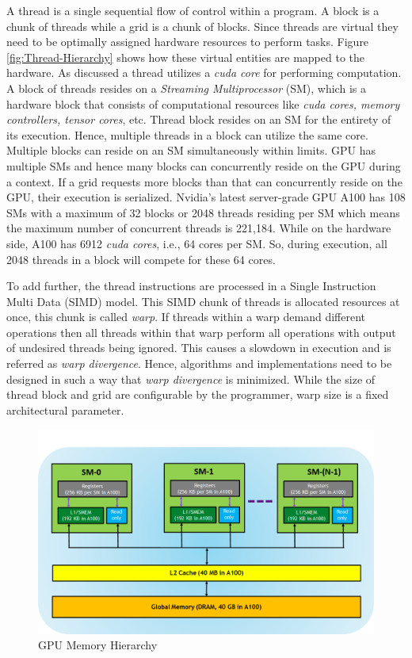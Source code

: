 A thread is a single sequential flow of control within a program.
A block is a chunk of threads while a grid is a chunk of blocks.
Since threads are virtual they need to be optimally assigned hardware resources to perform tasks.
Figure \ref{fig:Thread-Hierarchy} shows how these virtual entities are mapped to the hardware. As discussed a thread utilizes a \textit{cuda core} for performing computation. A block of threads resides on a \textit{Streaming Multiprocessor} (SM), which is a hardware block that consists of computational resources like \textit{cuda cores, memory controllers, tensor cores}, etc. Thread block resides on an SM for the entirety of its execution. Hence, multiple threads in a block can utilize the same core. Multiple blocks can reside on an SM simultaneously within limits.
GPU has multiple SMs and hence many blocks can concurrently reside on the GPU during a context. If a grid requests more blocks than that can concurrently reside on the GPU, their execution is serialized.
Nvidia's latest server-grade GPU A100 has 108 SMs with a maximum of 32 blocks or 2048 threads residing per SM which means the maximum number of concurrent threads is  221,184. While on the hardware side, A100 has 6912 \textit{cuda cores}, i.e., 64 cores per SM. So, during execution, all 2048 threads in a block will compete for these 64 cores.

To add further, the thread instructions are processed in a Single Instruction Multi Data (SIMD) model. This SIMD chunk of threads is allocated resources at once, this chunk is called \textit{warp}. If threads within a warp demand different operations then all threads within that warp perform all operations with output of undesired threads being ignored. This causes a slowdown in execution and is referred as \textit{warp divergence}. Hence, algorithms and implementations need to be designed in such a way that \textit{warp divergence} is minimized. While the size of thread block and grid are configurable by the programmer, warp size is a fixed architectural parameter.

\begin{figure}[h]
    \includegraphics[width=\textwidth]{fig/memory-hierarchy.png}
    \caption{GPU Memory Hierarchy}
    \label{fig:Memory-Hierarchy}
\end{figure}

